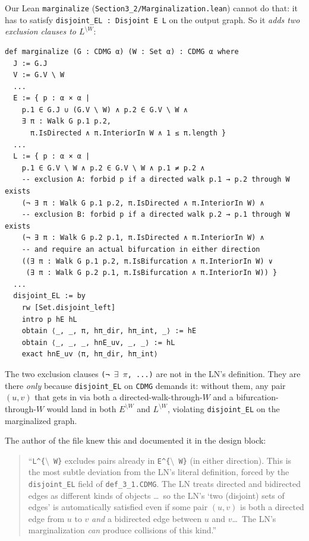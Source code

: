 \documentclass[11pt,a4paper]{article}
\providecommand{\sm}{\setminus}
\begin{document}
Our Lean \texttt{marginalize} (\texttt{Section3\_2/Marginalization.lean})
cannot do that: it has to satisfy
\texttt{disjoint\_EL : Disjoint E L} on the output graph. So it
\emph{adds two exclusion clauses to $L^{\sm W}$}:

\begin{lstlisting}
def marginalize (G : CDMG α) (W : Set α) : CDMG α where
  J := G.J
  V := G.V \ W
  ...
  E := { p : α × α |
    p.1 ∈ G.J ∪ (G.V \ W) ∧ p.2 ∈ G.V \ W ∧
    ∃ π : Walk G p.1 p.2,
      π.IsDirected ∧ π.InteriorIn W ∧ 1 ≤ π.length }
  ...
  L := { p : α × α |
    p.1 ∈ G.V \ W ∧ p.2 ∈ G.V \ W ∧ p.1 ≠ p.2 ∧
    -- exclusion A: forbid p if a directed walk p.1 → p.2 through W exists
    (¬ ∃ π : Walk G p.1 p.2, π.IsDirected ∧ π.InteriorIn W) ∧
    -- exclusion B: forbid p if a directed walk p.2 → p.1 through W exists
    (¬ ∃ π : Walk G p.2 p.1, π.IsDirected ∧ π.InteriorIn W) ∧
    -- and require an actual bifurcation in either direction
    ((∃ π : Walk G p.1 p.2, π.IsBifurcation ∧ π.InteriorIn W) ∨
     (∃ π : Walk G p.2 p.1, π.IsBifurcation ∧ π.InteriorIn W)) }
  ...
  disjoint_EL := by
    rw [Set.disjoint_left]
    intro p hE hL
    obtain ⟨_, _, π, hπ_dir, hπ_int, _⟩ := hE
    obtain ⟨_, _, _, hnE_uv, _, _⟩ := hL
    exact hnE_uv ⟨π, hπ_dir, hπ_int⟩
\end{lstlisting}

The two exclusion clauses \texttt{(¬ $\exists$ $\pi$, ...)} are not
in the LN's definition. They are there \emph{only} because
\texttt{disjoint\_EL} on \texttt{CDMG} demands it: without them, any
pair $(u, v)$ that gets in via both a directed-walk-through-$W$ and a
bifurcation-through-$W$ would land in both $E^{\sm W}$ and $L^{\sm W}$,
violating \texttt{disjoint\_EL} on the marginalized graph.

The author of the file knew this and documented it in the design block:

\begin{quote}
``\texttt{L\^{}\{$\sm$ W\}} excludes pairs already in
\texttt{E\^{}\{$\sm$ W\}} (in either direction). This is the most
subtle deviation from the LN's literal definition, forced by the
\texttt{disjoint\_EL} field of \texttt{def\_3\_1.CDMG}. The LN treats
directed and bidirected edges as different kinds of objects \dots\
so the LN's `two (disjoint) sets of edges' is automatically satisfied
even if some pair $(u, v)$ is both a directed edge from $u$ to $v$
\emph{and} a bidirected edge between $u$ and $v$\dots\ The LN's
marginalization \emph{can} produce collisions of this kind.''
\end{quote}
\end{document}
